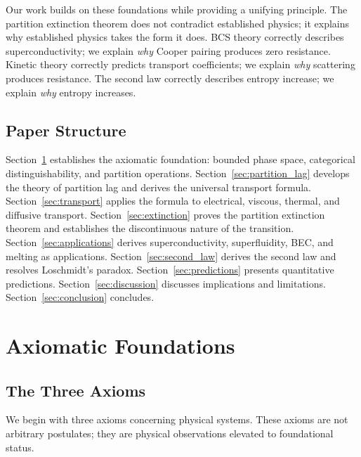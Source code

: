 \documentclass[twocolumn,10pt,aps,prd,superscriptaddress,nofootinbib]{revtex4-2}
\theoremstyle{remark}
\begin{document}
Our work builds on these foundations while providing a unifying principle. The partition extinction theorem does not contradict established physics; it explains why established physics takes the form it does. BCS theory correctly describes superconductivity; we explain \emph{why} Cooper pairing produces zero resistance. Kinetic theory correctly predicts transport coefficients; we explain \emph{why} scattering produces resistance. The second law correctly describes entropy increase; we explain \emph{why} entropy increases.

\subsection{Paper Structure}

Section~\ref{sec:axioms} establishes the axiomatic foundation: bounded phase space, categorical distinguishability, and partition operations. Section~\ref{sec:partition_lag} develops the theory of partition lag and derives the universal transport formula. Section~\ref{sec:transport} applies the formula to electrical, viscous, thermal, and diffusive transport. Section~\ref{sec:extinction} proves the partition extinction theorem and establishes the discontinuous nature of the transition. Section~\ref{sec:applications} derives superconductivity, superfluidity, BEC, and melting as applications. Section~\ref{sec:second_law} derives the second law and resolves Loschmidt's paradox. Section~\ref{sec:predictions} presents quantitative predictions. Section~\ref{sec:discussion} discusses implications and limitations. Section~\ref{sec:conclusion} concludes.


\section{Axiomatic Foundations}
\label{sec:axioms}

\subsection{The Three Axioms}

We begin with three axioms concerning physical systems. These axioms are not arbitrary postulates; they are physical observations elevated to foundational status.
\end{document}
